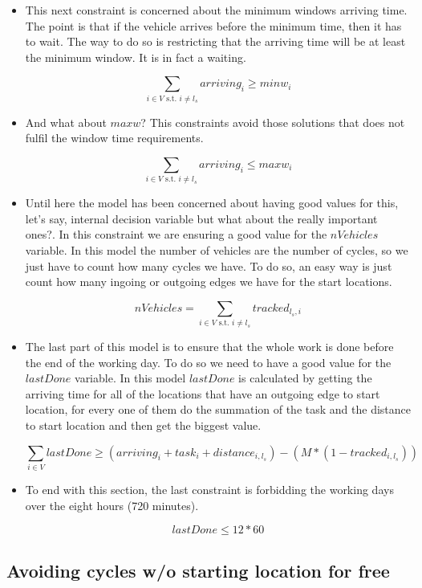 \documentclass[]{report}
\begin{document}
\begin{itemize}
	\item This next constraint is concerned about the minimum windows arriving time. The point is that if the vehicle arrives before the minimum time, then it has to wait. The way to do so is restricting that the arriving time will be at least the minimum window. It is in fact a waiting.
	
	$$\sum\limits_{i \in V \text{ s.t. } i \neq l_{s}} arriving_{i} \geq minw_{i}$$
	
	\item And what about $maxw$? This constraints avoid those solutions that does not fulfil the window time requirements.
	
	$$\sum\limits_{i \in V \text{ s.t. } i \neq l_{s}} arriving_{i} \leq maxw_{i}$$
	
	\item Until here the model has been concerned about having good values for this, let's say, internal decision variable but what about the really important ones?. In this constraint we are ensuring a good value for the $nVehicles$ variable. In this model the number of vehicles are the number of cycles, so we just have to count how many cycles we have. To do so, an easy way is just count how many ingoing or outgoing edges we have for the start locations.
	
	$$nVehicles = \sum\limits_{i \in V \text{ s.t. } i \neq l_{s}} tracked_{l_{s}, i}$$
	
	\item The last part of this model is to ensure that the whole work is done before the end of the working day. To do so we need to have a good value for the $lastDone$ variable. In this model $lastDone$ is calculated by getting the arriving time for all of the locations that have an outgoing edge to start location, for every one of them do the summation of the task and the distance to start location and then get the biggest value.
	
	$$ \sum\limits_{i \in V} lastDone \geq (arriving_i + task_i + distance_{i, l_{s}}) - (M*(1-tracked_{i, l_{s}}))$$
	
	\item To end with this section, the last constraint is forbidding the working days over the eight hours (720 minutes).
	
	$$ lastDone \leq 12*60$$


\end{itemize}

\subsection{Avoiding cycles w/o starting location for free}\label{ss:arriving_time_0_implications}
\end{document}
